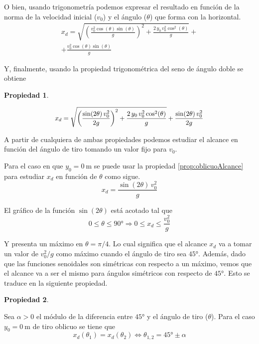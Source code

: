 \documentclass[a5paper,12pt,twoside]{book}
\newtheorem{prop}{{Propiedad}}[chapter]
\begin{document}
O bien, usando trigonometría podemos expresar el resultado en función de la norma de la velocidad inicial ($v_0$) y el ángulo ($\theta$) que forma con la horizontal.
\begin{multline*}
    x_d = \sqrt{\left(\frac{v_0^2 \cos(\theta) \sin(\theta)}{g}\right)^2 + \frac{2 \, y_0 \, v_0^2 \cos^2(\theta)}{g}} +
    \\ + \frac{v_0^2 \cos(\theta) \sin(\theta)}{g}
\end{multline*}

Y, finalmente, usando la propiedad trigonométrica del seno de ángulo doble se obtiene

\begin{mdframed}[style=MyFrame1]
    \begin{prop}
    \end{prop}
    \begin{equation*}
        \scale{0.94}{
        x_d = \sqrt{\left(\frac{\sin(2\theta) \, v_0^2}{2g}\right)^2 + \frac{2 \, y_0 \, v_0^2 \cos^2(\theta)}{g}} + \frac{\sin(2\theta) \, v_0^2}{2g}
        }
    \end{equation*}
\end{mdframed}

A partir de cualquiera de ambas propiedades podemos estudiar el alcance en función del ángulo de tiro tomando un valor fijo para $v_0$.

Para el caso en que $y_0 = \SI{0}{\metre}$ se puede usar la propiedad \ref{prop:oblicuoAlcance} para estudiar $x_d$ en función de $\theta$ como sigue.
\begin{equation*}
    x_d = \frac{\sin(2\theta) \, v_0^2}{g}
\end{equation*}

El gráfico de la función $\sin(2\theta)$ está acotado tal que
\begin{equation*}
    0 \leq \theta \leq \ang{90} \Rightarrow 0 \leq x_d \leq \frac{v_0^2}{g}
\end{equation*}

Y presenta un máximo en $\theta=\pi/4$. Lo cual significa que el alcance $x_d$ va a tomar un valor de $v_0^2/g$ como máximo cuando el ángulo de tiro sea $\ang{45}$. Además, dado que las funciones senoidales son simétricas con respecto a un máximo, vemos que el alcance va a ser el mismo para ángulos simétricos con respecto de $\ang{45}$. Esto se traduce en la siguiente propiedad.

\begin{mdframed}[style=MyFrame1]
    \begin{prop}
    \end{prop}
    Sea $\alpha>0$ el módulo de la diferencia entre $\ang{45}$ y el ángulo de tiro ($\theta$). Para el caso $y_0 = \SI{0}{\metre}$ de tiro oblicuo se tiene que
    \begin{equation*}
        x_d(\theta_1) = x_d(\theta_2) \iff \theta_{1,2} = \ang{45} \pm \alpha
    \end{equation*}
\end{mdframed}
\end{document}
